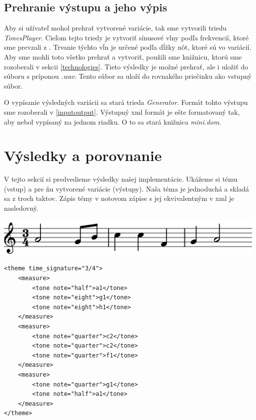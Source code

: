 \subsection{Prehranie výstupu a jeho výpis}
Aby si užívateľ mohol prehrať vytvorené variácie, tak sme vytvorili triedu \textit{TonesPlayer}. Cieľom tejto triedy je vytvoriť sínusové vlny podľa frekvencií, ktoré sme prevzali z \cite{strankaFrekvencii}. Trvanie týchto vĺn je určené podľa dĺžky nôt, ktoré sú vo variácií. Aby sme mohli toto všetko prehrať a vytvoriť, použili sme knižnicu, ktorú sme rozoberali v sekcii \ref{technologies}. Tieto výsledky je možné prehrať, ale i uložiť do súboru s príponou \textit{.wav}. Tento súbor sa uloží do rovnakého priečinku ako vstupný súbor.

O vypísanie výsledných variácii sa stará trieda \textit{Generator}. Formát tohto výstupu sme rozoberali v \ref{inputoutput}. Výstupný xml formát je ešte formatovaný tak, aby nebol vypísaný na jednom riadku. O to sa stará knižnica \textit{mini.dom}.

\section{Výsledky a porovnanie}
V tejto sekcií si predvedieme výsledky našej implementácie. Ukážeme si tému (vstup) a pre ňu vytvorené variácie (výstupy). Naša téma je jednoduchá a skladá sa z troch taktov. Zápis témy v notovom zápise s jej ekvivalentným v xml je nasledovný.

\begin{minipage}{0.45\textwidth}
\includegraphics[width=\textwidth]{thesis/obrazky-figures/theme.png}
\end{minipage}%
\begin{minipage}{0.5\textwidth}
\centering
\lstset{language=XML}
\begin{lstlisting}[basicstyle=\tiny]
<theme time_signature="3/4">
    <measure>
        <tone note="half">a1</tone>
        <tone note="eight">g1</tone>
        <tone note="eight">h1</tone>
    </measure>
    <measure>
        <tone note="quarter">c2</tone>
        <tone note="quarter">c2</tone>
        <tone note="quarter">f1</tone>
    </measure>
    <measure>
        <tone note="quarter">g1</tone>
        <tone note="half">a1</tone>
    </measure>
</theme>
\end{lstlisting}
\end{minipage}

